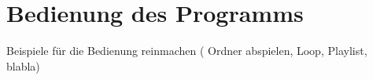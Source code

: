 \section{Bedienung des Programms}
Beispiele für die Bedienung reinmachen ( Ordner abspielen, Loop, Playlist, blabla)

